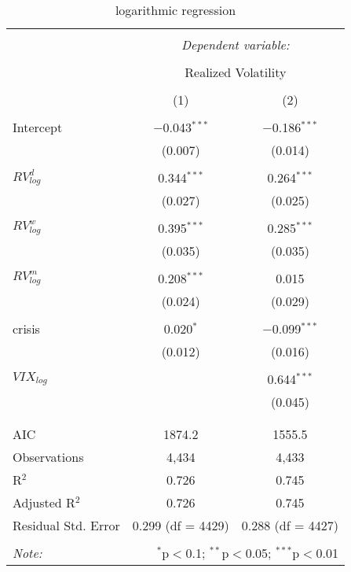 
\begin{table}[!htbp] \centering 
  \caption{logarithmic regression} 
  \label{} 
\begin{tabular}{@{\extracolsep{5pt}}lcc} 
\\[-1.8ex]\hline 
\hline \\[-1.8ex] 
 & \multicolumn{2}{c}{\textit{Dependent variable:}} \\ 
\cline{2-3} 
\\[-1.8ex] & \multicolumn{2}{c}{Realized Volatility} \\ 
\\[-1.8ex] & (1) & (2)\\ 
\hline \\[-1.8ex] 
 Intercept & $-$0.043$^{***}$ & $-$0.186$^{***}$ \\ 
  & (0.007) & (0.014) \\ 
  & & \\ 
 $RV^{d}_{log}$ & 0.344$^{***}$ & 0.264$^{***}$ \\ 
  & (0.027) & (0.025) \\ 
  & & \\ 
 $RV^{w}_{log}$ & 0.395$^{***}$ & 0.285$^{***}$ \\ 
  & (0.035) & (0.035) \\ 
  & & \\ 
 $RV^{m}_{log}$ & 0.208$^{***}$ & 0.015 \\ 
  & (0.024) & (0.029) \\ 
  & & \\ 
 crisis & 0.020$^{*}$ & $-$0.099$^{***}$ \\ 
  & (0.012) & (0.016) \\ 
  & & \\ 
 $VIX_{log}$ &  & 0.644$^{***}$ \\ 
  &  & (0.045) \\ 
  & & \\ 
\hline \\[-1.8ex] 
AIC & 1874.2 & 1555.5 \\ 
Observations & 4,434 & 4,433 \\ 
R$^{2}$ & 0.726 & 0.745 \\ 
Adjusted R$^{2}$ & 0.726 & 0.745 \\ 
Residual Std. Error & 0.299 (df = 4429) & 0.288 (df = 4427) \\ 
\hline 
\hline \\[-1.8ex] 
\textit{Note:}  & \multicolumn{2}{r}{$^{*}$p$<$0.1; $^{**}$p$<$0.05; $^{***}$p$<$0.01} \\ 
\end{tabular} 
\end{table} 
